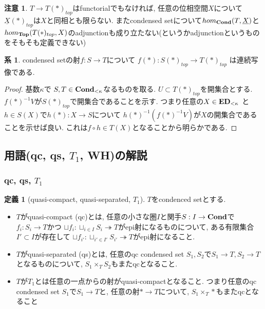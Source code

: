 \documentclass[dvipdfmx,a4paper,11pt]{article}
\theoremstyle{definition}
\newtheorem{cor}[thm]{系}
\newtheorem{dfn}[thm]{定義}
\newtheorem{rem}[thm]{注意}
\begin{document}
\begin{rem}
$T \to T(\ast)_{top}$はfunctorialでもなければ, 任意の位相空間$X$について$\underline{X}(\ast)_{top}$は$X$と同相とも限らない. またcondensed setについて$hom_{{\bf Cond}}(T,\underline{X})$と$hom_{{\bf Top}}(T(\ast)_{top}, X)$のadjunctionも成り立たない(というかadjunctionというものをそもそも定義できない)
\end{rem}
  \begin{tcolorbox}
 [colback = white, colframe = green!35!black, fonttitle = \bfseries,breakable = true]
  \begin{cor}
  condensed setの射$f : S\to T$について
  $f(\ast) : S(\ast)_{top} \to T(\ast)_{top}$
  は連続写像である.
 \end{cor}
  \end{tcolorbox}
 \begin{proof}
 基数$\kappa$で
 $S, T \in {\bf Cond}_{< \kappa}$なるものを取る.
 $U \subset T(\ast)_{top}$を開集合とする. 
 $f(\ast)^{-1}V$が$S(\ast)_{top} $で開集合であることを示す.
 つまり任意の$X \in {\bf ED}_{<\kappa}$ と$h \in S(X)$で$h(\ast): X \to S$について
 $h(\ast)^{-1}(f(\ast)^{-1}V)$が$X$の開集合であることを示せば良い.
 これは$f \circ h \in T(X)$となることから明らかである. 
 \end{proof}


\subsection{用語(qc, qs, $T_1$, WH)の解説}
\subsubsection{qc, qs, $T_1$}

 \begin{tcolorbox}
 [colback = white, colframe = green!35!black, fonttitle = \bfseries,breakable = true]
\begin{dfn}[quasi-compact, quasi-separated, $T_1$]
$T$をcondenced setとする. 
\begin{itemize}
\item $T$がquasi-compact (qc)とは, 任意の小さな圏$I$と関手$S : I \to {\bf Cond}$で$f_i : S_i \to T$かつ
$\sqcup f_i : \sqcup_{i \in I} S_i \twoheadrightarrow T$がepi射になるものについて, 
ある有限集合$I' \subset I$が存在して
$\sqcup f_{i'} : \sqcup_{i' \in I'} S_{i'} \twoheadrightarrow T$がepi射になること.
\item $T$がquasi-separated (qs)とは, 任意のqc condensed set $S_1, S_2$で$S_1 \to T, S_2\to T$となるものについて, $S_1 \times_{T}S_2$もまたqcとなること.
\item $T$が$T_1$とは任意の一点からの射がquasi-compactとなること. 
つまり任意のqc condensed set $S_1$で$S_1 \to T$と, 任意の射$\ast \to T$について, $S_1 \times_{T}\ast$もまたqcとなること 
\end{itemize}
\end{dfn}
 \end{tcolorbox}
 
\end{document}
